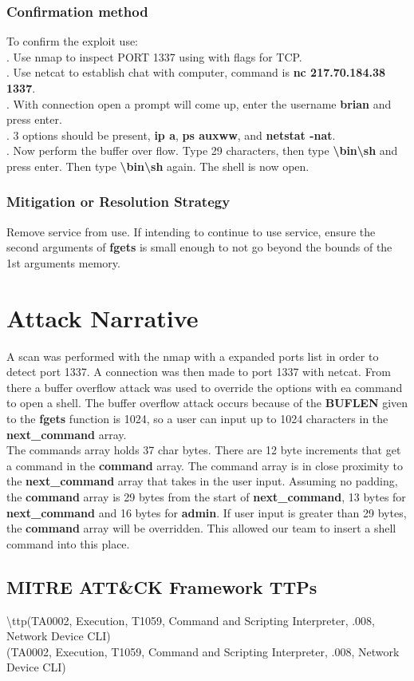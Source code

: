 \documentclass[notitlepage]{article}
\begin{document}
	\subsubsection{Confirmation method}
	To confirm the exploit use: \\
	. Use nmap to inspect PORT 1337 using with flags for TCP.\\
	. Use netcat to establish chat with computer, command is \textbf{nc 217.70.184.38 1337}.  \\
	. With connection open a prompt will come up, enter the username \textbf{brian} and press enter.\\
	. 3 options should be present, \textbf{ip a}, \textbf{ps auxww}, and \textbf{netstat -nat}. \\
	. Now perform the buffer over flow.  Type 29 characters, then type \textbf{\textbackslash bin\textbackslash sh} and press enter. Then type \textbf{\textbackslash bin\textbackslash sh} again. The shell is now open.  \\
	
	
	\subsubsection{Mitigation or Resolution Strategy}
	\indent Remove service from use. If intending to continue to use service, ensure the second arguments of \textbf{fgets} is small enough to not go beyond the bounds of the 1st arguments memory. \\
	
	\section{Attack Narrative}
	\indent A scan was performed with the nmap with a expanded ports list in order to detect port 1337.  A connection was then made to port 1337 with netcat. From there a buffer overflow attack was used to override the options with ea command to open a shell. The buffer overflow attack occurs because of the \textbf{BUFLEN} given to the \textbf{fgets} function is 1024, so a user can input up to 1024 characters in the \textbf{next\_command} array.  \\ 
	\indent The commands array holds 37 char bytes. There are 12 byte increments that get a command in the \textbf{command} array. The command array is in close proximity to the \textbf{next\_command} array that takes in the user input. Assuming no padding, the \textbf{command} array is 29 bytes from the start of \textbf{next\_command}, 13 bytes for \textbf{next\_command} and 16 bytes for \textbf{admin}. If user input is greater than 29 bytes, the \textbf{command} array will be overridden. This allowed our team to insert a shell command into this place. \\
  
	
	\subsection{MITRE ATT{\&}CK Framework TTPs}
	
	\indent\textbackslash ttp(TA0002, Execution, T1059, Command and Scripting Interpreter, .008, Network Device CLI) \\
	
	\ttp(TA0002, Execution, T1059, Command and Scripting Interpreter, .008, Network Device CLI) \\
\end{document}
